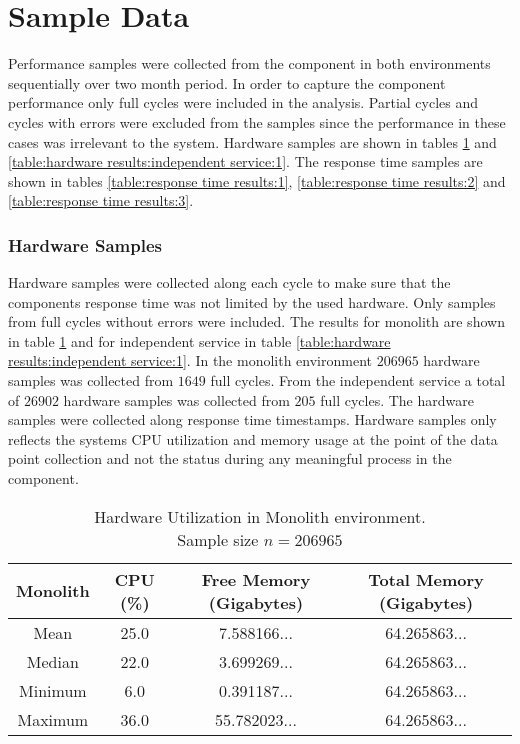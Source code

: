 \section{Sample Data}
Performance samples were collected from the component in both environments sequentially over two month period.
In order to capture the component performance only full cycles were included in the analysis.
Partial cycles and cycles with errors were excluded from the samples since the performance in these cases was irrelevant to the system.
Hardware samples are shown in tables \ref{table:hardware results:monolith:1} and \ref{table:hardware results:independent service:1}.
The response time samples are shown in tables \ref{table:response time results:1}, \ref{table:response time results:2} and \ref{table:response time results:3}.

\subsubsection{Hardware Samples}
Hardware samples were collected along each cycle to make sure that the components response time was not limited by the used hardware.
Only samples from full cycles without errors were included.
The results for monolith are shown in table \ref{table:hardware results:monolith:1} and for independent service in table \ref{table:hardware results:independent service:1}.
In the monolith environment $206965$ hardware samples was collected from $1649$ full cycles.
From the independent service a total of $26902$ hardware samples was collected from $205$ full cycles.
The hardware samples were collected along response time timestamps.
Hardware samples only reflects the systems CPU utilization and memory usage at the point of the data point collection and not the status during any meaningful process in the component.

\begin{table}[ht!]
    \begin{tabular}{|c c c c|} 
        \hline
        Monolith
        & CPU (\%)
        & Free Memory (Gigabytes)
        & Total Memory (Gigabytes) \\ [0.5ex] 
        
        \hline\hline
        Mean
        & 25.0
        & 7.588166...
        & 64.265863... \\ 
        
        Median
        & 22.0
        & 3.699269...
        & 64.265863... \\ 

        Minimum
        & 6.0
        & 0.391187...
        & 64.265863... \\ 
        
        Maximum
        & 36.0
        & 55.782023...
        & 64.265863... \\
        \hline
    \end{tabular}
    \caption{Hardware Utilization in Monolith environment.
    \\ Sample size $n=206 965$}
    \label{table:hardware results:monolith:1}
\end{table}

